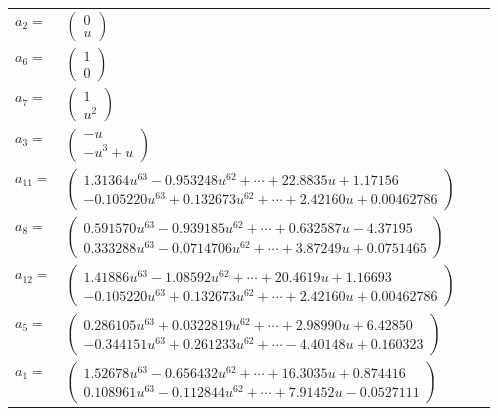 \documentclass[1p]{elsarticle_modified}
\theoremstyle{definition}
\begin{document}
\begin{tabular}{m{7pt} m{180pt} m{7pt} m{180pt} }
\flushright $a_{2}=$&$\begin{pmatrix}0\\u\end{pmatrix}$ \\
\flushright $a_{6}=$&$\begin{pmatrix}1\\0\end{pmatrix}$ \\
\flushright $a_{7}=$&$\begin{pmatrix}1\\u^2\end{pmatrix}$ \\
\flushright $a_{3}=$&$\begin{pmatrix}- u\\- u^3+u\end{pmatrix}$ \\
\flushright $a_{11}=$&$\begin{pmatrix}1.31364 u^{63}-0.953248 u^{62}+\cdots+22.8835 u+1.17156\\-0.105220 u^{63}+0.132673 u^{62}+\cdots+2.42160 u+0.00462786\end{pmatrix}$ \\
\flushright $a_{8}=$&$\begin{pmatrix}0.591570 u^{63}-0.939185 u^{62}+\cdots+0.632587 u-4.37195\\0.333288 u^{63}-0.0714706 u^{62}+\cdots+3.87249 u+0.0751465\end{pmatrix}$ \\
\flushright $a_{12}=$&$\begin{pmatrix}1.41886 u^{63}-1.08592 u^{62}+\cdots+20.4619 u+1.16693\\-0.105220 u^{63}+0.132673 u^{62}+\cdots+2.42160 u+0.00462786\end{pmatrix}$ \\
\flushright $a_{5}=$&$\begin{pmatrix}0.286105 u^{63}+0.0322819 u^{62}+\cdots+2.98990 u+6.42850\\-0.344151 u^{63}+0.261233 u^{62}+\cdots-4.40148 u+0.160323\end{pmatrix}$ \\
\flushright $a_{1}=$&$\begin{pmatrix}1.52678 u^{63}-0.656432 u^{62}+\cdots+16.3035 u+0.874416\\0.108961 u^{63}-0.112844 u^{62}+\cdots+7.91452 u-0.0527111\end{pmatrix}$ \\

\end{tabular}
\end{document}
